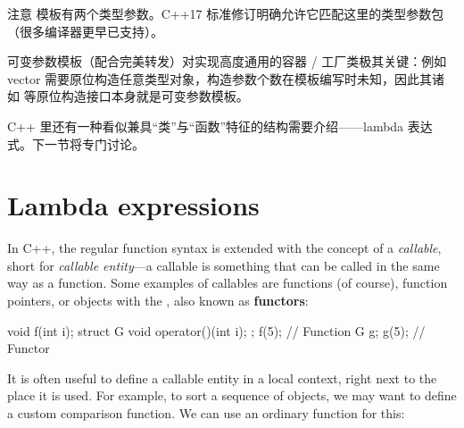 注意  模板有两个类型参数。C++17 标准修订明确允许它匹配这里的类型参数包（很多编译器更早已支持）。

可变参数模板（配合完美转发）对实现高度通用的容器 / 工厂类极其关键：例如 vector 需要原位构造任意类型对象，构造参数个数在模板编写时未知，因此其诸如  等原位构造接口本身就是可变参数模板。

C++ 里还有一种看似兼具“类”与“函数”特征的结构需要介绍——lambda 表达式。下一节将专门讨论。

\section{Lambda expressions}

In C++, the regular function syntax is extended with the concept of a \emph{callable}, short for \emph{callable entity}---a callable is something that can be called in the same way as a function. Some examples of callables are functions (of course), function pointers, or objects with the , also known as \textbf{functors}:

\begin{code}
void f(int i); struct G {
  void operator()(int i);
};
f(5);            // Function
G g; g(5);        // Functor
\end{code}

It is often useful to define a callable entity in a local context, right next to the place it is used. For example, to sort a sequence of objects, we may want to define a custom comparison function. We can use an ordinary function for this:

